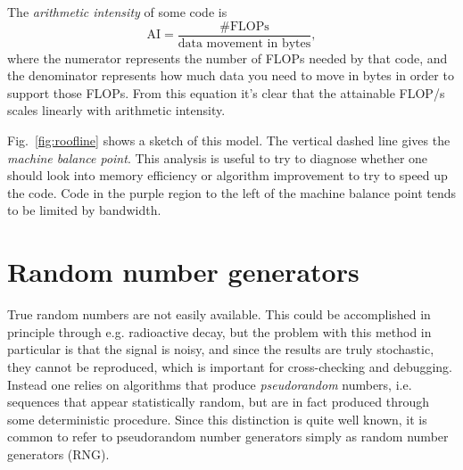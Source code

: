 The {\it arithmetic intensity} of some code is
\begin{equation}
  \text{AI}=\frac{\text{\# FLOPs}}{\text{data movement in bytes}},
\end{equation}
where the numerator represents the number of FLOPs needed by that code, and the
denominator represents how much data you need to move in bytes in order to
support those FLOPs. From this equation it's clear that the attainable
FLOP/s scales linearly with arithmetic intensity.

Fig.~\ref{fig:roofline} shows a sketch of this model. The vertical
dashed line gives the {\it machine balance point}.
This analysis is useful to try to diagnose whether one should look into
memory efficiency or algorithm improvement to try to speed up the code.
Code in the purple region to the left of the machine balance point
tends to be limited by bandwidth.


\section{Random number generators}

True random numbers are not easily available. This could be accomplished in
principle through e.g. radioactive decay, but the problem with this method in
particular is that the signal is noisy, and since the results are truly
stochastic, they cannot be reproduced, which is important for cross-checking
and debugging.
Instead one relies on algorithms that produce {\it pseudorandom} 
numbers, i.e. sequences that appear statistically
random, but are in fact produced through some deterministic procedure.
Since this distinction is quite well known, it is common to refer to
pseudorandom number generators simply as random number generators (RNG).

